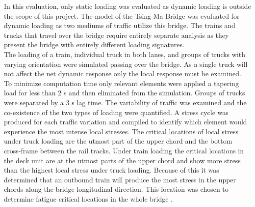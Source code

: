 \indent In this evaluation, only static loading was evaluated as dynamic loading is outside the scope of this project. The model of the Tsing Ma Bridge was evaluated for dynamic loading as two mediums of traffic utilize this bridge. The trains and trucks that travel over the bridge require entirely separate analysis as they present the bridge with entirely different loading signatures.\\
\indent The loading of a train, individual truck in both lanes, and groups of trucks with varying orientation were simulated passing over the bridge. As a single truck will not affect the net dynamic response only the local response must be examined. To minimize computation time only relevant elements were applied a tapering load for less than 2 s and then eliminated from the simulation. Groups of trucks were separated by a 3 s lag time. The variability of traffic was examined and the co-existence of the two types of loading were quantified. A stress cycle was produced for each traffic variation and compiled to identify which element would experience the most intense local stresses. The critical locations of local stress under truck loading are the utmost part of the upper chord and the bottom cross-frame between the rail tracks. Under train loading the critical locations in the deck unit are at the utmost parts of the upper chord and show more stress than the highest local stress under truck loading. Because of this it was determined that an outbound train will produce the most stress in the upper chords along the bridge longitudinal direction. This location was chosen to determine fatigue critical locations in the whole bridge \cite{Chan}. 
